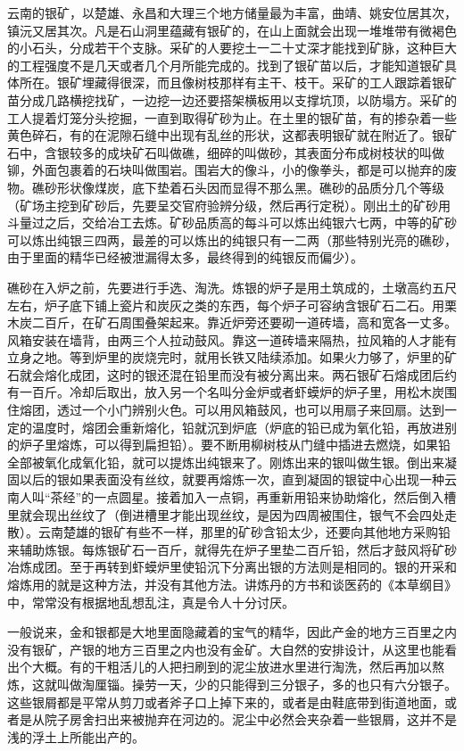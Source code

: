 \documentclass[12pt,UTF8]{ctexbook}
\begin{document}
云南的银矿，以楚雄、永昌和大理三个地方储量最为丰富，曲靖、姚安位居其次，镇沅又居其次。凡是石山洞里蕴藏有银矿的，在山上面就会出现一堆堆带有微褐色的小石头，分成若干个支脉。采矿的人要挖土一二十丈深才能找到矿脉，这种巨大的工程强度不是几天或者几个月所能完成的。找到了银矿苗以后，才能知道银矿具体所在。银矿埋藏得很深，而且像树枝那样有主干、枝干。采矿的工人跟踪着银矿苗分成几路横挖找矿，一边挖一边还要搭架横板用以支撑坑顶，以防塌方。采矿的工人提着灯笼分头挖掘，一直到取得矿砂为止。在土里的银矿苗，有的掺杂着一些黄色碎石，有的在泥隙石缝中出现有乱丝的形状，这都表明银矿就在附近了。银矿石中，含银较多的成块矿石叫做礁，细碎的叫做砂，其表面分布成树枝状的叫做铆，外面包裹着的石块叫做围岩。围岩大的像斗，小的像拳头，都是可以抛弃的废物。礁砂形状像煤炭，底下垫着石头因而显得不那么黑。礁砂的品质分几个等级（矿场主挖到矿砂后，先要呈交官府验辨分级，然后再行定税）。刚出土的矿砂用斗量过之后，交给冶工去炼。矿砂品质高的每斗可以炼出纯银六七两，中等的矿砂可以炼出纯银三四两，最差的可以炼出的纯银只有一二两（那些特别光亮的礁砂，由于里面的精华已经被泄漏得太多，最终得到的纯银反而偏少）。

礁砂在入炉之前，先要进行手选、淘洗。炼银的炉子是用土筑成的，土墩高约五尺左右，炉子底下铺上瓷片和炭灰之类的东西，每个炉子可容纳含银矿石二石。用栗木炭二百斤，在矿石周围叠架起来。靠近炉旁还要砌一道砖墙，高和宽各一丈多。风箱安装在墙背，由两三个人拉动鼓风。靠这一道砖墙来隔热，拉风箱的人才能有立身之地。等到炉里的炭烧完时，就用长铁又陆续添加。如果火力够了，炉里的矿石就会熔化成团，这时的银还混在铅里而没有被分离出来。两石银矿石熔成团后约有一百斤。冷却后取出，放入另一个名叫分金炉或者虾蟆炉的炉子里，用松木炭围住熔团，透过一个小门辨别火色。可以用风箱鼓风，也可以用扇子来回扇。达到一定的温度时，熔团会重新熔化，铅就沉到炉底（炉底的铅已成为氧化铅，再放进别的炉子里熔炼，可以得到扁担铅）。要不断用柳树枝从门缝中插进去燃烧，如果铅全部被氧化成氧化铅，就可以提炼出纯银来了。刚炼出来的银叫做生银。倒出来凝固以后的银如果表面没有丝纹，就要再熔炼一次，直到凝固的银锭中心出现一种云南人叫“茶经”的一点圆星。接着加入一点铜，再重新用铅来协助熔化，然后倒入槽里就会现出丝纹了（倒进槽里才能出现丝纹，是因为四周被围住，银气不会四处走散）。云南楚雄的银矿有些不一样，那里的矿砂含铅太少，还要向其他地方采购铅来辅助炼银。每炼银矿石一百斤，就得先在炉子里垫二百斤铅，然后才鼓风将矿砂冶炼成团。至于再转到虾蟆炉里使铅沉下分离出银的方法则是相同的。银的开采和熔炼用的就是这种方法，并没有其他方法。讲炼丹的方书和谈医药的《本草纲目》中，常常没有根据地乱想乱注，真是令人十分讨厌。

一般说来，金和银都是大地里面隐藏着的宝气的精华，因此产金的地方三百里之内没有银矿，产银的地方三百里之内也没有金矿。大自然的安排设计，从这里也能看出个大概。有的干粗活儿的人把扫刷到的泥尘放进水里进行淘洗，然后再加以熬炼，这就叫做淘厘锱。操劳一天，少的只能得到三分银子，多的也只有六分银子。这些银屑都是平常从剪刀或者斧子口上掉下来的，或者是由鞋底带到街道地面，或者是从院子房舍扫出来被抛弃在河边的。泥尘中必然会夹杂着一些银屑，这并不是浅的浮土上所能出产的。
\end{document}
